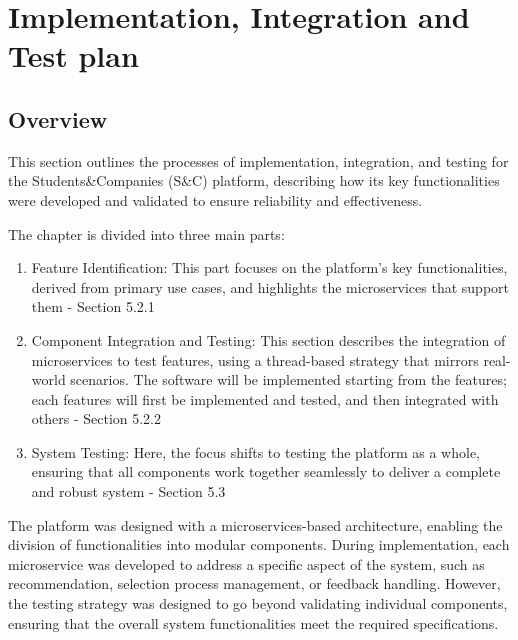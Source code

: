 \chapter{Implementation, Integration and Test plan}

\section{Overview}

This section outlines the processes of implementation, integration, and testing for the Students\&Companies
(S\&C) platform, describing how its key functionalities were developed and validated to ensure
reliability and effectiveness.

The chapter is divided into three main parts:

\begin{enumerate}
    \item Feature Identification: This part focuses on the platform's key functionalities, derived from
    primary use cases, and highlights the microservices that support them - Section 5.2.1
    \item Component Integration and Testing: This section describes the integration of microservices
    to test features, using a thread-based strategy that mirrors real-world scenarios.
    The software will be implemented starting from the features; each features
    will first be implemented and tested, and then integrated with others - Section 5.2.2
    \item System Testing: Here, the focus shifts to testing the platform as a whole, ensuring that
    all components work together seamlessly to deliver a complete and robust system - Section 5.3
\end{enumerate}

The platform was designed with a microservices-based architecture, enabling the division
of functionalities into modular components. During implementation, each microservice was
developed to address a specific aspect of the system, such as recommendation, selection
process management, or feedback handling. However, the testing strategy was designed to go
beyond validating individual components, ensuring that the overall system functionalities
meet the required specifications.

